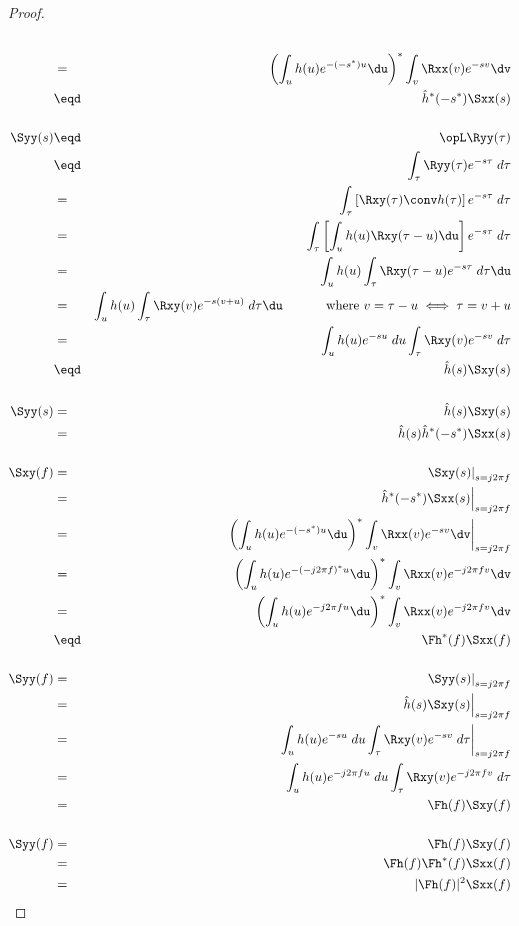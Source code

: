 \begin{proof}
\begin{eqnarray*}
   \\&=&    \left(\int_u h(u) e^{-(-s^\ast)u} \du \right)^\ast
            \int_v \Rxx(v)e^{-sv} \dv
   \\&\eqd& \hat{h}^\ast(-s^\ast) \Sxx(s)
\\
\\
   \Syy(s)
     &\eqd& \opL \Ryy(\tau)
   \\&\eqd& \int_\tau \Ryy(\tau) e^{-s\tau} \; d\tau
   \\&=&    \int_\tau \left[ \Rxy(\tau) \conv h(\tau) \right] e^{-s\tau} \; d\tau
   \\&=&    \int_\tau \left[ \int_u h(u) \Rxy(\tau-u)\du \right] e^{-s\tau} \; d\tau
   \\&=&    \int_u h(u) \int_\tau \Rxy(\tau-u) e^{-s\tau} \; d\tau\du
   \\&=&    \int_u h(u) \int_\tau \Rxy(v) e^{-s(v+u)} \; d\tau\du
            \hspace{3em}\mbox{ where $v=\tau-u\iff \tau=v+u$}
   \\&=&    \int_u h(u)e^{-su} \;du \int_\tau \Rxy(v) e^{-sv} \; d\tau
   \\&\eqd& \hat{h}(s) \Sxy(s)
\\
\\
   \Syy(s)
     &=& \hat{h}(s) \Sxy(s)
   \\&=& \hat{h}(s) \hat{h}^\ast(-s^\ast) \Sxx(s)
\\
\\
   \Sxy(f)
     &=&    \left.\Sxy(s)\right|_{s=j2\pi f}
   \\&=&    \left. \hat{h}^\ast(-s^\ast) \Sxx(s)\right|_{s=j2\pi f}
   \\&=&    \left.
            \left(\int_u h(u) e^{-(-s^\ast)u} \du \right)^\ast
            \int_v \Rxx(v)e^{-sv} \dv
            \right|_{s=j2\pi f}
   \\&=&    \left(\int_u h(u) e^{-(-j2\pi f)^\ast u} \du \right)^\ast
            \int_v \Rxx(v)e^{-j2\pi fv} \dv
   \\&=&    \left(\int_u h(u) e^{-j2\pi f u} \du \right)^\ast
            \int_v \Rxx(v)e^{-j2\pi fv} \dv
   \\&\eqd& \Fh^\ast(f) \Sxx(f)
\\
\\
   \Syy(f)
     &=&    \left.\Syy(s)\right|_{s=j2\pi f}
   \\&=&    \left. \hat{h}(s) \Sxy(s) \right|_{s=j2\pi f}
   \\&=&    \left. \int_u h(u)e^{-su} \;du \int_\tau \Rxy(v) e^{-sv} \; d\tau\right|_{s=j2\pi f}
   \\&=&    \int_u h(u)e^{-j2\pi fu} \;du \int_\tau \Rxy(v) e^{-j2\pi fv} \; d\tau
   \\&=&    \Fh(f) \Sxy(f)
\\
\\
  \Syy(f)
     &=&    \Fh(f)\Sxy(f)
   \\&=&    \Fh(f) \Fh^\ast(f) \Sxx(f)
   \\&=&    |\Fh(f)|^2 \Sxx(f)
\end{eqnarray*}


\end{proof}

